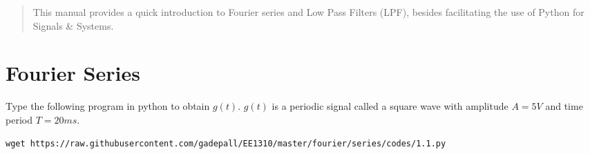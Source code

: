 \documentclass[journal,12pt,twocolumn]{IEEEtran}
\begin{document}
%
\IEEEpeerreviewmaketitle

\begin{abstract}
This manual provides a quick introduction to Fourier series and Low Pass Filters (LPF), besides facilitating the use of Python for Signals \& Systems.
\end{abstract}
\section{Fourier Series}
%
\begin{problem}
Type the following program in python to obtain $g(t)$.  $g(t)$ is a periodic signal called a square wave with amplitude $A = 5V$ and time period $T=20 ms$.
\end{problem}
%
\solution
\begin{lstlisting}
wget https://raw.githubusercontent.com/gadepall/EE1310/master/fourier/series/codes/1.1.py
\end{lstlisting}
\end{document}
